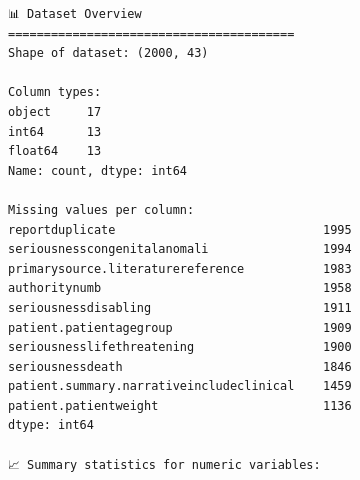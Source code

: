 \documentclass[
  letterpaper,
  DIV=11,
  numbers=noendperiod]{scrartcl}
\begin{document}
\begin{verbatim}
📊 Dataset Overview
========================================
Shape of dataset: (2000, 43)

Column types:
object     17
int64      13
float64    13
Name: count, dtype: int64

Missing values per column:
reportduplicate                             1995
seriousnesscongenitalanomali                1994
primarysource.literaturereference           1983
authoritynumb                               1958
seriousnessdisabling                        1911
patient.patientagegroup                     1909
seriousnesslifethreatening                  1900
seriousnessdeath                            1846
patient.summary.narrativeincludeclinical    1459
patient.patientweight                       1136
dtype: int64

📈 Summary statistics for numeric variables:
\end{verbatim}
\end{document}
